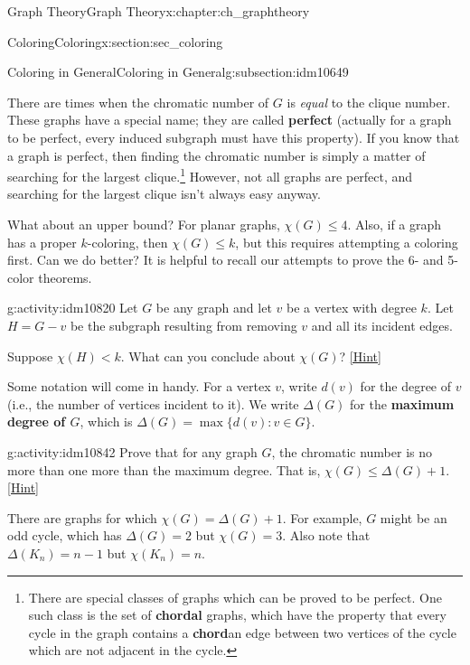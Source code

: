 \documentclass[oneside,10pt,]{book}
\newcommand{\terminology}[1]{\textbf{#1}}
\numberwithin{equation}{chapter}
\def\st{:}
\newcommand{\lt}{<}
\begin{document}
\begin{chapterptx}{Graph Theory}{}{Graph Theory}{}{}{x:chapter:ch_graphtheory}
\begin{sectionptx}{Coloring}{}{Coloring}{}{}{x:section:sec_coloring}
\begin{subsectionptx}{Coloring in General}{}{Coloring in General}{}{}{g:subsection:idm10649}
\par
There are times when the chromatic number of \(G\) is \emph{equal} to the clique number. These graphs have a special name; they are called \terminology{perfect} (actually for a graph to be perfect, every induced subgraph must have this property). If you know that a graph is perfect, then finding the chromatic number is simply a matter of searching for the largest clique.\footnote{There are special classes of graphs which can be proved to be perfect.  One such class is the set of \terminology{chordal} graphs, which have the property that every cycle in the graph contains a \terminology{chord}\textemdash{}an edge between two vertices of the cycle which are not adjacent in the cycle.\label{g:fn:idm10812}} However, not all graphs are perfect, and searching for the largest clique isn't always easy anyway.%
\par
What about an upper bound?  For planar graphs, \(\chi(G) \le 4\).  Also, if a graph has a proper \(k\)-coloring, then \(\chi(G) \le k\), but this requires attempting a coloring first.  Can we do better? It is helpful to recall our attempts to prove the 6- and 5-color theorems.%
\begin{activity}{}{g:activity:idm10820}%
Let \(G\) be any graph and let \(v\) be a vertex with degree \(k\).  Let \(H = G - v\) be the subgraph resulting from removing \(v\) and all its incident edges.%
\par
Suppose \(\chi(H) \lt k\).  What can you conclude about \(\chi(G)\)?%
\space\hspace*{0pt}\hfill{\tiny\hyperlink{g:hint:idm10831-back}{[Hint]}}\end{activity}
Some notation will come in handy.  For a vertex \(v\), write \(d(v)\) for the degree of \(v\) (i.e., the number of vertices incident to it).  We write \(\Delta(G)\) for the \terminology{maximum degree of \(G\)}, which is \(\Delta(G) = \max\{d(v) \st v \in G\}\).%
\begin{activity}{}{g:activity:idm10842}%
Prove that for any graph \(G\), the chromatic number is no more than one more than the maximum degree.  That is, \(\chi(G) \le \Delta(G) + 1\).%
\space\hspace*{0pt}\hfill{\tiny\hyperlink{g:hint:idm10847-back}{[Hint]}}\end{activity}
There are graphs for which \(\chi(G) = \Delta(G) + 1\).  For example, \(G\) might be an odd cycle, which has \(\Delta(G) = 2\) but \(\chi(G) = 3\).  Also note that \(\Delta(K_n) = n-1\) but \(\chi(K_n) = n\).%
\par

\end{subsectionptx}
\end{sectionptx}
\end{chapterptx}
\end{document}
